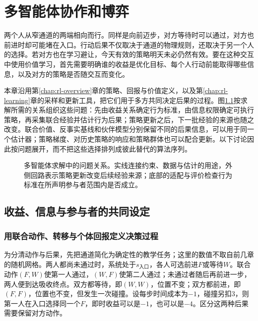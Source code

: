 \chapter{多智能体协作和博弈}
\label{chap:rl-multi-agent}

两个人从窄通道的两端相向而行。同样是向前迈步，对方等待时可以通过，对方也前进时却可能堵在入口。行动后果不仅取决于通道的物理规则，还取决于另一个人的选择。若对方也在学习避让，今天有效的策略明天未必仍然有效。要在这种交互中使用价值学习，首先需要明确谁的收益是优化目标、每个人行动前能取得哪些信息，以及对方的策略是否随交互而变化。

本章沿用第\ref{chap:rl-overview}章的策略、回报与价值定义，以及第\ref{chap:rl-learning}章的采样和更新工具，把它们用于多方共同决定后果的过程。图\ref{fig:rl-multi-agent-map}按求解所需的关系组织这些问题：先由收益关系确定行为标准，由信息权限确定可执行策略，再采集联合经验并估计行为后果；策略更新之后，下一批经验的来源也随之改变。联合价值、反事实基线和伙伴模型分别保留不同的后果信息，可以用于同一个估计器；策略梯度、对历史策略的响应和策略群体也可以配合更新。以下讨论因此按问题展开，而不把这些选择排列成彼此替代的算法序列。

\begin{figure}[htbp]
  \centering
  
  \caption{多智能体求解中的问题关系。实线连接约束、数据与估计的用途，外侧回路表示策略更新改变后续经验来源；底部的适配与评价检查行为标准在所声明参与者范围内是否成立。}
  \label{fig:rl-multi-agent-map}
\end{figure}

\section{收益、信息与参与者的共同设定}
\label{sec:rl-multi-agent-setting}

\subsection{用联合动作、转移与个体回报定义决策过程}
\label{sec:rl-multi-agent-process}

为分清动作与后果，先把通道简化为确定性的教学任务；这里的数值不取自前几章的随机网格。两人都尚未通过时，系统处于$s_{\text{入口}}$，各人可选前进$F$或等待$W$。联合动作$(F,W)$使第一人通过，$(W,F)$使第二人通过；未通过者随后再前进一步，两人便到达吸收终点。双方都等待，即$(W,W)$，位置不变；双方都前进，即$(F,F)$，位置也不变，但发生一次碰撞。设每步时间成本为$-1$，碰撞另扣$3$，则第一人在入口选择同一个$F$，即时收益可以是$-1$，也可以是$-4$。区分这两种后果需要保留对方动作。

